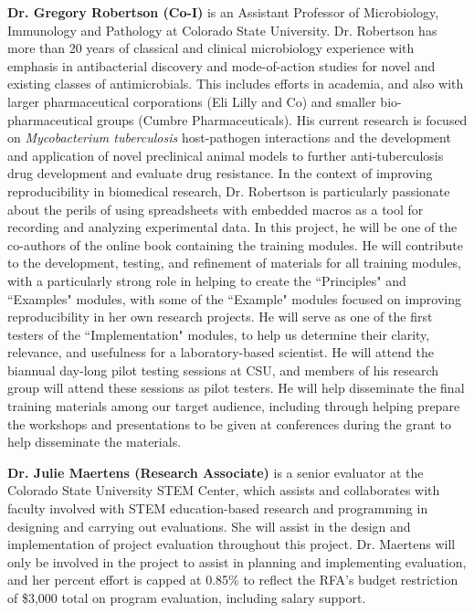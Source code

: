 \documentclass[pdftex,english,11pt,parskip=half]{scrartcl}
\begin{document}
\noindent \textbf{Dr. Gregory Robertson (Co-I)} is an Assistant Professor of Microbiology, Immunology and Pathology at Colorado State University. Dr. Robertson has more than 20 years of classical and clinical microbiology experience with emphasis in antibacterial discovery and mode-of-action studies for novel and existing classes of antimicrobials. This includes efforts in academia, and also with larger pharmaceutical corporations (Eli Lilly and Co) and smaller bio-pharmaceutical groups (Cumbre Pharmaceuticals). His current research is focused on \textit{Mycobacterium tuberculosis} host-pathogen interactions and the development and application of novel preclinical animal models to further anti-tuberculosis drug development and evaluate drug resistance. In the context of improving reproducibility in biomedical research, Dr. Robertson is particularly passionate about the perils of using spreadsheets with embedded macros as a tool for recording and analyzing experimental data. In this project, he will be one of the co-authors of the online book containing the training modules. He will contribute to the development, testing, and refinement of materials for all training modules, with a particularly strong role in helping to create the ``Principles" and ``Examples" modules, with some of the ``Example" modules focused on improving reproducibility in her own research projects. He will serve as one of the first testers of the ``Implementation" modules, to help us determine their clarity, relevance, and usefulness for a laboratory-based scientist. He will attend the biannual day-long pilot testing sessions at CSU, and members of his research group will attend these sessions as pilot testers. He will help disseminate the final training materials among our target audience, including through helping prepare the workshops and presentations to be given at conferences during the grant to help disseminate the materials. 

\noindent \textbf{Dr. Julie Maertens (Research Associate)} is a senior evaluator at the Colorado State University STEM Center, which assists and collaborates with faculty involved with STEM education-based research and programming in designing and carrying out evaluations. She will assist in the design and implementation of project evaluation throughout this project. Dr. Maertens will only be involved in the project to assist in planning and implementing evaluation, and her percent effort is capped at 0.85\% to reflect the RFA's budget restriction of \$3,000 total on program evaluation, including salary support.
\end{document}
